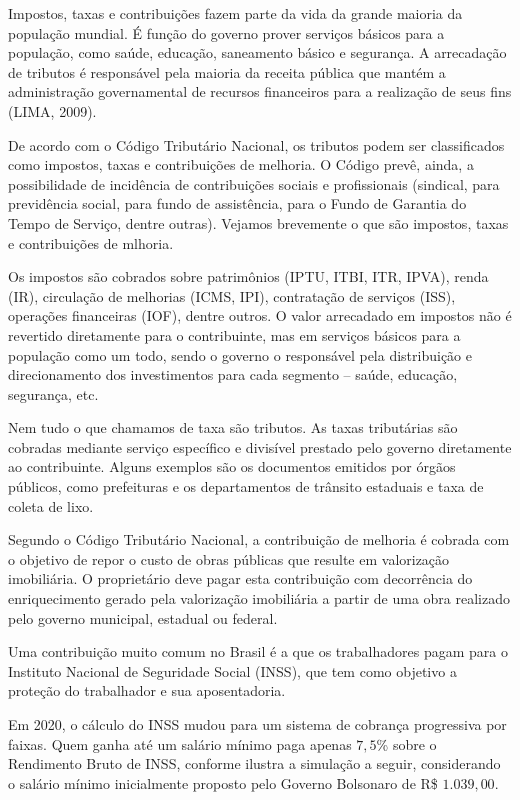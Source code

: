 
Impostos, taxas e contribuições fazem parte da vida da grande maioria da população mundial. É função do governo prover serviços básicos para a população, como saúde, educação, saneamento básico e segurança. A arrecadação de tributos é responsável pela maioria da receita pública que mantém a administração governamental de recursos financeiros para a realização de seus fins (LIMA, 2009).

De acordo com o Código Tributário Nacional, os tributos podem ser classificados como impostos, taxas e contribuições de melhoria. O Código prevê, ainda, a possibilidade de incidência de contribuições sociais e profissionais (sindical, para previdência social, para fundo de assistência, para o Fundo de Garantia do Tempo de Serviço, dentre outras). Vejamos brevemente o que são impostos, taxas e contribuições de mlhoria.

Os impostos são cobrados sobre patrimônios (IPTU, ITBI, ITR, IPVA), renda (IR), circulação de melhorias (ICMS, IPI), contratação de serviços (ISS), operações financeiras (IOF), dentre outros. O valor arrecadado em impostos não é revertido diretamente para o contribuinte, mas em serviços básicos para a população como um todo, sendo o governo o responsável pela distribuição e direcionamento dos investimentos para cada segmento -- saúde, educação, segurança, etc.

Nem tudo o que chamamos de taxa são tributos. As taxas tributárias são cobradas mediante serviço específico e divisível prestado pelo governo diretamente ao contribuinte. Alguns exemplos são os documentos emitidos por órgãos públicos, como prefeituras e os departamentos de trânsito estaduais e taxa de coleta de lixo.

Segundo o Código Tributário Nacional, a contribuição de melhoria é cobrada com o objetivo de repor o custo de obras públicas que resulte em valorização imobiliária. O proprietário deve pagar esta contribuição com decorrência do enriquecimento gerado pela valorização imobiliária a partir de uma obra realizado pelo governo municipal, estadual ou federal.

Uma contribuição muito comum no Brasil é a que os trabalhadores pagam para o Instituto Nacional de Seguridade Social (INSS), que tem como objetivo a proteção do trabalhador e sua aposentadoria.

Em 2020, o cálculo do INSS mudou para um sistema de cobrança progressiva por faixas. Quem ganha até um salário mínimo paga apenas $7{,}5$\% sobre o Rendimento Bruto de INSS, conforme ilustra a simulação a seguir, considerando o salário mínimo inicialmente proposto pelo Governo Bolsonaro de R\$ $1.039{,}00$.

